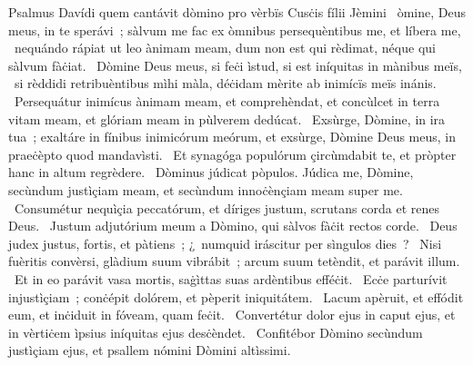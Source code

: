 { Psalmus Davídi quem cantávit dòmino pro vèrbïs Cusċis fílii Jèmini}
{%
~òmine, Deus meus, in te sperávi~; sàlvum me fac ex òmnibus persequèntibus me, et líbera me,
~nequándo rápiat ut leo ànimam meam, dum non est qui rèdimat, néque qui sàlvum fàċiat.
~Dòmine Deus meus, si feċi ìstud, si est iníquitas in mànibus meïs,
~si rèddidi retribuèntibus mìhi màla, déċidam mèrite ab inimícïs meïs inánis.
~Persequátur inimícus ànimam meam, et comprehèndat, et concùlcet in terra vitam meam, et glóriam meam in pùlverem dedúcat.
~Exsùrge, Dòmine, in ira tua~; exaltáre in fínibus inimicórum meórum, et exsùrge, Dòmine Deus meus, in praeċèpto quod mandavìsti.
~Et synagóga populórum çircùmdabit te, et pròpter hanc in altum regrèdere.
~Dòminus júdicat pòpulos. Júdica me, Dòmine, secùndum justìçiam meam, et secùndum innoċènçiam meam super me.
~Consumétur nequìçia peccatórum, et díriges justum, scrutans corda et renes Deus.
~Justum adjutórium meum a Dòmino, qui sàlvos fàċit rectos corde.
~Deus judex justus, fortis, et pàtiens~; ¿~numquid iráscitur per sìngulos dies~?
~Nisi fuèritis convèrsi, glàdium suum vibrábit~; arcum suum tetèndit, et parávit illum.
~Et in eo parávit vasa mortis, saġìttas suas ardèntibus efféċit.
~Ecċe parturívit injustìçiam~; conċépit dolórem, et pèperit iniquitátem.
~Lacum apèruit, et effódit eum, et inċiduit in fóveam, quam feċit.
~Convertétur dolor ejus in caput ejus, et in vèrtiċem ìpsius iníquitas ejus desċèndet.
~Confitébor Dòmino secùndum justìçiam ejus, et psallem nómini Dòmini altìssimi.
}
